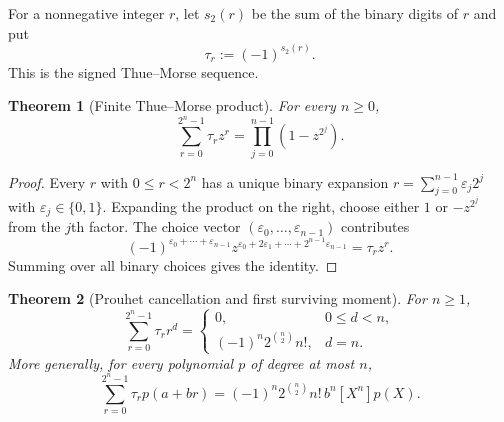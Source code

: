 \documentclass[11pt,oneside,openany]{book}
\newtheorem{theorem}{Theorem}[chapter]
\theoremstyle{definition}
\theoremstyle{remark}
\begin{document}
For a nonnegative integer $r$, let $s_2(r)$ be the sum of the binary digits of $r$ and put
\[
 \tau_r:=(-1)^{s_2(r)}.
\]
This is the signed Thue--Morse sequence.

\begin{theorem}[Finite Thue--Morse product]\label{thm:thue-morse-product}
For every $n\ge0$,
\begin{equation}\label{eq:thue-morse-product}
 \sum_{r=0}^{2^n-1}\tau_r z^r
 =\prod_{j=0}^{n-1}(1-z^{2^j}).
\end{equation}
\end{theorem}

\begin{proof}
Every $r$ with $0\le r<2^n$ has a unique binary expansion
$r=\sum_{j=0}^{n-1}\varepsilon_j2^j$ with $\varepsilon_j\in\{0,1\}$.  Expanding the product on the right, choose either $1$ or $-z^{2^j}$ from the $j$th factor.  The choice vector $(\varepsilon_0,\ldots,\varepsilon_{n-1})$ contributes
\[
 (-1)^{\varepsilon_0+\cdots+\varepsilon_{n-1}}
 z^{\varepsilon_0+2\varepsilon_1+\cdots+2^{n-1}\varepsilon_{n-1}}
 =\tau_rz^r.
\]
Summing over all binary choices gives the identity.
\end{proof}

\begin{theorem}[Prouhet cancellation and first surviving moment]\label{thm:thue-morse-moments}
For $n\ge1$,
\begin{equation}\label{eq:thue-morse-moments}
 \sum_{r=0}^{2^n-1}\tau_r r^d
 =
 \begin{cases}
  0,&0\le d<n,\\
  (-1)^n2^{\binom n2}n!,&d=n.
 \end{cases}
\end{equation}
More generally, for every polynomial $p$ of degree at most $n$,
\begin{equation}\label{eq:thue-morse-polynomial-functional}
 \sum_{r=0}^{2^n-1}\tau_r p(a+br)
 =(-1)^n2^{\binom n2}n!\,b^n[X^n]p(X).
\end{equation}
\end{theorem}
\end{document}
